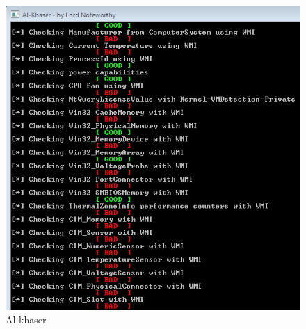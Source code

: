 \begin{figure}[htp]
    \centering
    \includegraphics[width=\linewidth]{images/al1.png}%
    \caption{Al-khaser}%
    \label{fig:alk1}%
\end{figure}



